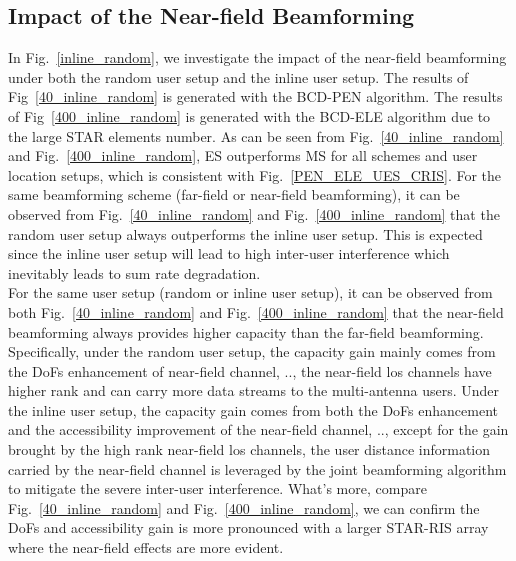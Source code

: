 \documentclass[12pt, draftclsnofoot, onecolumn]{IEEEtran}
\newcommand{\ie}{\text{i}.\text{e}.}
\newcommand{\los}{\gls{los}\xspace}
\begin{document}
\subsection{Impact of the Near-field Beamforming}
In Fig.~\ref{inline_random}, we investigate the impact of the near-field beamforming under both the random user setup and the inline user setup. The results of Fig~\ref{40_inline_random} is generated with the BCD-PEN algorithm. The results of Fig~\ref{400_inline_random} is generated with the BCD-ELE algorithm due to the large STAR elements number. As can be seen from Fig.~\ref{40_inline_random} and Fig.~\ref{400_inline_random}, ES outperforms MS for all schemes and user location setups, which is consistent with Fig.~\ref{PEN_ELE_UES_CRIS}. For the same beamforming scheme (far-field or near-field beamforming), it can be observed from Fig.~\ref{40_inline_random} and Fig.~\ref{400_inline_random} that the random user setup always outperforms the inline user setup. This is expected since the inline user setup will lead to high inter-user interference which inevitably leads to sum rate degradation.\\
\indent For the same user setup (random or inline user setup), it can be observed from both Fig.~\ref{40_inline_random} and Fig.~\ref{400_inline_random} that the near-field beamforming always provides higher capacity than the far-field beamforming. Specifically, under the random user setup, the capacity gain mainly comes from the DoFs enhancement of near-field channel, \ie, the near-field \los channels have higher rank and can carry more data streams to the multi-antenna users. Under the inline user setup, the capacity gain comes from both the DoFs enhancement and the accessibility improvement of the near-field channel, \ie, except for the gain brought by the high rank near-field \los channels, the user distance information carried by the near-field channel is leveraged by the joint beamforming algorithm to mitigate the severe inter-user interference. What’s more, compare Fig.~\ref{40_inline_random} and Fig.~\ref{400_inline_random}, we can confirm the DoFs and accessibility gain is more pronounced with a larger STAR-RIS array where the near-field effects are more evident. 
\vspace{-0.3cm}
\end{document}

